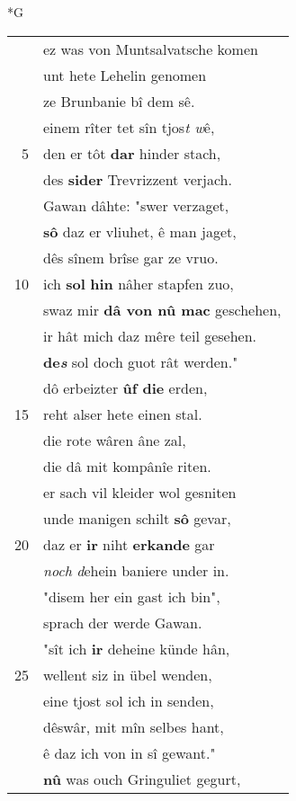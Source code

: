 \documentclass[8pt,a4paper,notitlepage]{article}
\begin{document}
\begin{table}[ht]
\begin{minipage}[t]{0.5\linewidth}
\small
\begin{center}*G
\end{center}
\begin{tabular}{rl}
 & ez was von Muntsalvatsche komen\\ 
 & unt hete Lehelin genomen\\ 
 & ze Brunbanie bî dem sê.\\ 
 & einem rîter tet sîn tjos\textit{t w}ê,\\ 
5 & den er tôt \textbf{dar} hinder stach,\\ 
 & des \textbf{sider} Trevrizzent verjach.\\ 
 & Gawan dâhte: "swer verzaget,\\ 
 & \textbf{sô} daz er vliuhet, ê man jaget,\\ 
 & dês sînem brîse gar ze vruo.\\ 
10 & ich \textbf{sol} \textbf{hin} nâher stapfen zuo,\\ 
 & swaz mir \textbf{dâ von nû mac} geschehen,\\ 
 & ir hât mich daz mêre teil gesehen.\\ 
 & \textbf{de\textit{s}} sol doch guot rât werden."\\ 
 & dô erbeizter \textbf{ûf die} erden,\\ 
15 & reht alser hete einen stal.\\ 
 & die rote wâren âne zal,\\ 
 & die dâ mit kompânîe riten.\\ 
 & er sach vil kleider wol gesniten\\ 
 & unde manigen schilt \textbf{sô} gevar,\\ 
20 & daz er \textbf{ir} niht \textbf{erkande} gar\\ 
 & \textit{noch} \textit{d}ehein baniere under in.\\ 
 & "disem her ein gast ich bin",\\ 
 & sprach der werde Gawan.\\ 
 & "sît ich \textbf{ir} deheine künde hân,\\ 
25 & wellent siz in übel wenden,\\ 
 & eine tjost sol ich in senden,\\ 
 & dêswâr, mit mîn selbes hant,\\ 
 & ê daz ich von in sî gewant."\\ 
 & \textbf{nû} was ouch Gringuliet gegurt,\\ 

\end{tabular}
\end{minipage}
\end{table}
\end{document}
